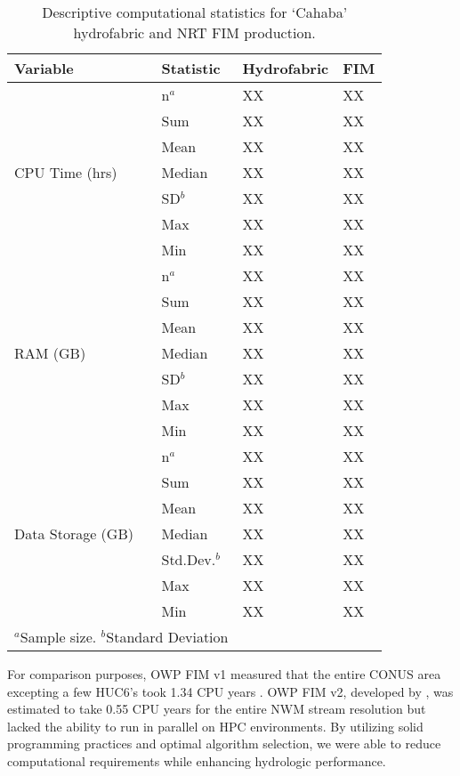 \begin{table}
\caption{Descriptive computational statistics for `Cahaba' hydrofabric and NRT FIM production.}
\label{tab:comp_results}
\centering
\begin{tabular}{|p{3cm}|p{3cm}|p{3cm}|p{3cm}|}
\hline
Variable & Statistic & Hydrofabric & FIM \\
\hline
\multirow{7}{*}{CPU Time (hrs)} &
n$^{a}$ & XX & XX \\ 
\cline{2-4}
& Sum  & XX & XX \\ 
\cline{2-4}
& Mean & XX & XX \\ 
\cline{2-4}
& Median & XX & XX \\ 
\cline{2-4}
& SD$^{b}$ & XX & XX \\ 
\cline{2-4}
& Max & XX & XX \\ 
\cline{2-4}
& Min & XX & XX \\ 
\hline
\multirow{7}{*}{RAM (GB)} &
n$^{a}$ & XX & XX \\
\cline{2-4}
& Sum  & XX & XX \\
\cline{2-4}
& Mean & XX & XX \\
\cline{2-4}
& Median & XX & XX \\
\cline{2-4}
& SD$^{b}$ & XX & XX \\
\cline{2-4}
& Max & XX & XX \\
\cline{2-4}
& Min & XX & XX \\
\hline
\multirow{7}{*}{Data Storage (GB)} &
n$^{a}$ & XX & XX \\
\cline{2-4}
& Sum  & XX & XX \\
\cline{2-4}
& Mean & XX & XX \\
\cline{2-4}
& Median & XX & XX \\
\cline{2-4}
& Std.Dev.$^{b}$ & XX & XX \\
\cline{2-4}
& Max & XX & XX \\
\cline{2-4}
& Min & XX & XX \\
\hline
\multicolumn{2}{l}{$^{a}$Sample size. $^{b}$Standard Deviation}
\end{tabular}
\end{table}

For comparison purposes, OWP FIM v1 measured that the entire CONUS area excepting a few HUC6's took 1.34 CPU years \cite{liu2016cybergis}. 
OWP FIM v2, developed by , was estimated to take 0.55 CPU years for the entire NWM stream resolution but lacked the ability to run in parallel on HPC environments.
By utilizing solid programming practices and optimal algorithm selection, we were able to reduce computational requirements while enhancing hydrologic performance.

